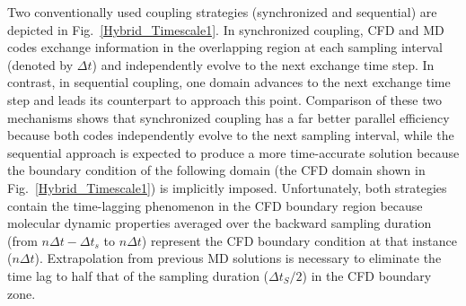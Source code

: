 \documentclass[preprint,12pt]{elsarticle}
\begin{document}
Two conventionally used coupling strategies (synchronized and sequential) are depicted in Fig.~\ref{Hybrid_Timescale1}. In synchronized coupling, CFD and MD codes exchange information in the overlapping region at each sampling interval (denoted by ${\Delta}t$) and independently evolve to the next exchange time step. In contrast, in sequential coupling, one domain advances to the next exchange time step and leads its counterpart to approach this point. Comparison of these two mechanisms shows that synchronized coupling has a far better parallel efficiency because both codes independently evolve to the next sampling interval, while the sequential approach is expected to produce a more time-accurate solution because the boundary condition of the following domain (the CFD domain shown in Fig.~\ref{Hybrid_Timescale1}) is implicitly imposed. Unfortunately, both strategies contain the time-lagging phenomenon in the CFD boundary region because molecular dynamic properties averaged over the backward sampling duration (from $n{\Delta}t-{\Delta}t_{s}$ to $n{\Delta}t$) represent the CFD boundary condition at that instance ($n{\Delta}t$). Extrapolation from previous MD solutions is necessary to eliminate the time lag to half that of the sampling duration (${\Delta}t_{S}/{2}$) in the CFD boundary zone.
\end{document}
